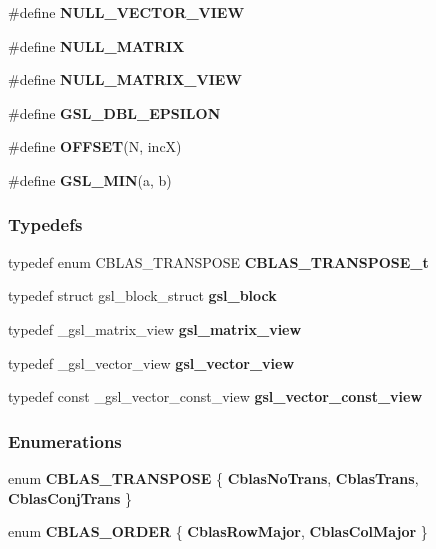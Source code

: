 \begin{CompactItemize}
\item 
\#define \textbf{NULL\_\-VECTOR\_\-VIEW}\label{group__nr_gd53a17dfdfc936b7559bdc08efbe1c7e}

\item 
\#define \textbf{NULL\_\-MATRIX}\label{group__nr_g9aaa363ea623569297d0fced07b4b263}

\item 
\#define \textbf{NULL\_\-MATRIX\_\-VIEW}\label{group__nr_g2c402132fe8822a31f21b968666fa188}

\item 
\#define \textbf{GSL\_\-DBL\_\-EPSILON}\label{group__nr_g2ee9a14250ef1c11d3a454c93703de4e}

\item 
\#define \textbf{OFFSET}(N, incX)\label{group__nr_g098f1989e95be172fad854c44d1be6ee}

\item 
\#define \textbf{GSL\_\-MIN}(a, b)\label{group__nr_ga97847b845ae5d3fbbec4d2d8ec3310d}

\end{CompactItemize}
\subsubsection*{Typedefs}
\begin{CompactItemize}
\item 
typedef enum CBLAS\_\-TRANSPOSE \textbf{CBLAS\_\-TRANSPOSE\_\-t}\label{group__nr_gfe7082539a5d26f5c498526d07ebe8d3}

\item 
typedef struct gsl\_\-block\_\-struct \textbf{gsl\_\-block}\label{group__nr_g3858db8a10651ceb818008b6db3fed1e}

\item 
typedef \_\-gsl\_\-matrix\_\-view \textbf{gsl\_\-matrix\_\-view}\label{group__nr_g8aacfa9dbffc4c6918036c329437dc40}

\item 
typedef \_\-gsl\_\-vector\_\-view \textbf{gsl\_\-vector\_\-view}\label{group__nr_g2a9448788d5ea6053036f94bce37ca9b}

\item 
typedef const \_\-gsl\_\-vector\_\-const\_\-view \textbf{gsl\_\-vector\_\-const\_\-view}\label{group__nr_gcba10bedbc0a23130b5d8e52b83b925e}

\end{CompactItemize}
\subsubsection*{Enumerations}
\begin{CompactItemize}
\item 
enum \textbf{CBLAS\_\-TRANSPOSE} \{ \textbf{CblasNoTrans}, 
\textbf{CblasTrans}, 
\textbf{CblasConjTrans}
 \}
\item 
enum \textbf{CBLAS\_\-ORDER} \{ \textbf{CblasRowMajor}, 
\textbf{CblasColMajor}
 \}
\end{CompactItemize}
